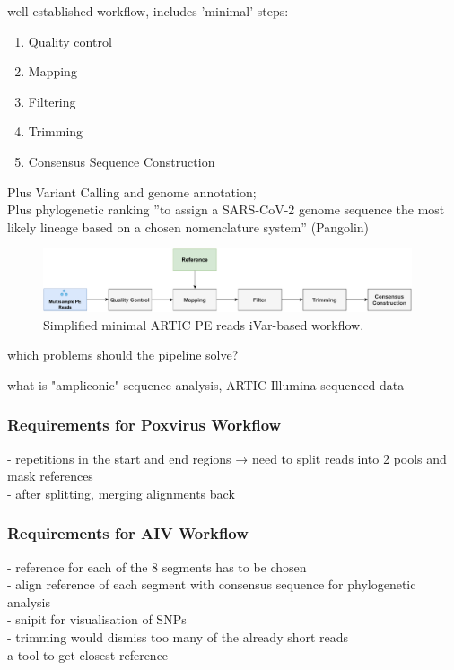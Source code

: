 well-established workflow, includes 'minimal' steps:
\begin{enumerate}
	\item Quality control
	\item Mapping
	\item Filtering
	\item Trimming
	\item Consensus Sequence Construction
\end{enumerate}

Plus Variant Calling and genome annotation; \\
Plus phylogenetic ranking ''to assign a SARS-CoV-2 genome sequence the most likely lineage based on a chosen nomenclature system'' (Pangolin)

\begin{figure}
	\centering
	\includegraphics[width=0.97\textwidth]{media/3-pipelines-minimal.pdf}
	\caption{Simplified minimal ARTIC PE reads iVar-based workflow.}
	\label{fig:3-pipelines-minimal}
\end{figure}

which problems should the pipeline solve?

what is "ampliconic" sequence analysis, ARTIC Illumina-sequenced data

\subsubsection{Requirements for Poxvirus Workflow}
- repetitions in the start and end regions → need to split reads into 2 pools and mask references \\
- after splitting, merging alignments back

\subsubsection{Requirements for AIV Workflow}
- reference for each of the 8 segments has to be chosen \\
- align reference of each segment with consensus sequence for phylogenetic analysis \\
- snipit for visualisation of SNPs \\
- trimming would dismiss too many of the already short reads
\\ a tool to get closest reference

